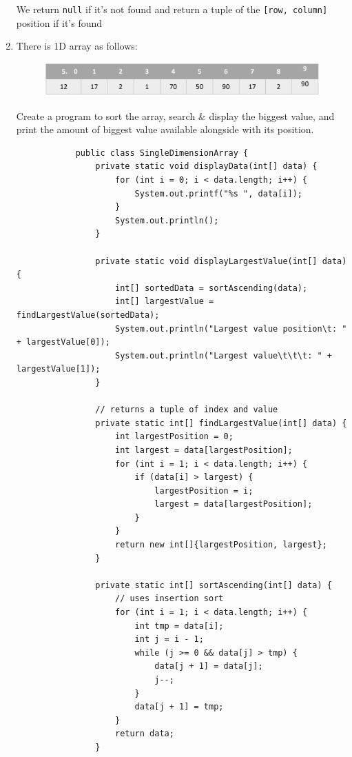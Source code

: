 \documentclass[12pt,titlepage]{article}
\begin{document}
\begin{enumerate}
{\begin{itemize}
{                We return \texttt{null} if it's not found and return a tuple of the \texttt{[row, column]} position if it's found
            }
        \end{itemize}
    }
    \pagebreak
    \item {
        There is 1D array as follows:
        
        \begin{figure}[h]
            \centering
            \includegraphics[width=.8\textwidth]{./images/1d-array.png}
        \end{figure}

        Create a program to sort the array, search \& display the biggest value, and print the amount of biggest value available alongside with its position.

        \begin{verbatim}
            public class SingleDimensionArray {
                private static void displayData(int[] data) {
                    for (int i = 0; i < data.length; i++) {
                        System.out.printf("%s ", data[i]);
                    }
                    System.out.println();
                }

                private static void displayLargestValue(int[] data) {
                    int[] sortedData = sortAscending(data);
                    int[] largestValue = findLargestValue(sortedData);
                    System.out.println("Largest value position\t: " + largestValue[0]);
                    System.out.println("Largest value\t\t\t: " + largestValue[1]);
                }

                // returns a tuple of index and value
                private static int[] findLargestValue(int[] data) {
                    int largestPosition = 0;
                    int largest = data[largestPosition];
                    for (int i = 1; i < data.length; i++) {
                        if (data[i] > largest) {
                            largestPosition = i;
                            largest = data[largestPosition];
                        }
                    }
                    return new int[]{largestPosition, largest};
                }

                private static int[] sortAscending(int[] data) {
                    // uses insertion sort
                    for (int i = 1; i < data.length; i++) {
                        int tmp = data[i];
                        int j = i - 1;
                        while (j >= 0 && data[j] > tmp) {
                            data[j + 1] = data[j];
                            j--;
                        }
                        data[j + 1] = tmp;
                    }
                    return data;
                }


\end{verbatim}}
\end{enumerate}
\end{document}
